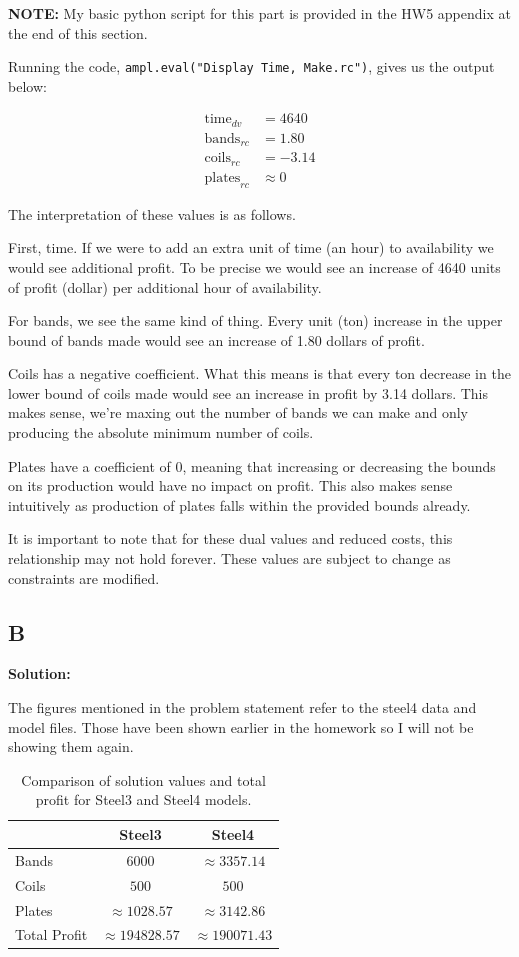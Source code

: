 \sol

\textbf{NOTE:} My basic python script for this part is provided in the HW5 appendix at the end of this section.


Running the code, \texttt{ampl.eval("Display Time, Make.rc")}, gives us the output below:

\begin{align*}
	\text{time}_{dv} &= 4640 \\
	\text{bands}_{rc} &= 1.80 \\
	\text{coils}_{rc} &= -3.14 \\
	\text{plates}_{rc} &\approx 0
\end{align*}

The interpretation of these values is as follows. 

First, time. If we were to add an extra unit of time (an hour) to availability we would see additional profit. To be precise we would see an increase of 4640 units of profit (dollar) per additional hour of availability. 

For bands, we see the same kind of thing. Every unit (ton) increase in the upper bound of bands made would see an increase of 1.80 dollars of profit. 

Coils has a negative coefficient. What this means is that every ton decrease in the lower bound of coils made would see an increase in profit by 3.14 dollars. This makes sense, we're maxing out the number of bands we can make and only producing the absolute minimum number of coils. 

Plates have a coefficient of 0, meaning that increasing or decreasing the bounds on its production would have no impact on profit. This also makes sense intuitively as production of plates falls within the provided bounds already. 

It is important to note that for these dual values and reduced costs, this relationship may not hold forever. These values are subject to change as constraints are modified.

\subsection*{B}

\noindent\textbf{Solution:}

The figures mentioned in the problem statement refer to the steel4 data and model files. Those have been shown earlier in the homework so I will not be showing them again. 

\begin{table}[h!]
\centering
\begin{tabular}{lcc}
\hline
 & \textbf{Steel3} & \textbf{Steel4} \\
\hline
Bands  & $6000$       & $\approx 3357.14$ \\
Coils  & $500$        & $500$ \\
Plates & $\approx 1028.57$ & $\approx 3142.86$ \\
Total Profit & $\approx 194828.57$ & $\approx 190071.43$ \\
\hline
\end{tabular}
\caption{Comparison of solution values and total profit for Steel3 and Steel4 models.}
\end{table}


